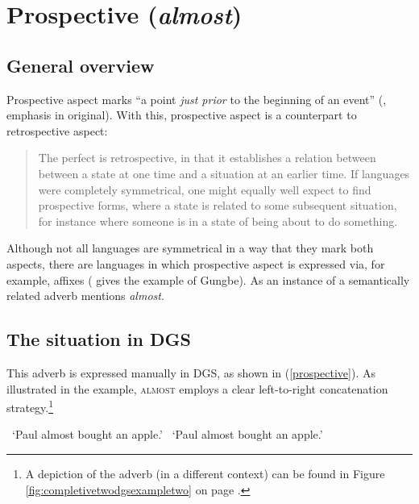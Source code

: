 
\section{Prospective (\textit{almost})}
\subsection{General overview}
Prospective aspect marks ``a point \textit{just prior} to the beginning of an event'' (\citealt[332]{frawley1992linguistic}, emphasis in original). With this, prospective aspect is a counterpart to retrospective aspect:

\begin{quote}
The perfect is retrospective, in that it establishes a relation between between a state at one time and a situation at an earlier time. If languages were completely symmetrical, one might equally well expect to find prospective forms, where a state is related to some subsequent situation, for instance where someone is in a state of being about to do something. \citep[64]{comrie1976aspect}
\end{quote}

\noindent Although not all languages are symmetrical in a way that they mark both aspects, there are languages in which prospective aspect is expressed via, for example, affixes (\citealt[99]{cinque1999adverbs} gives the example of Gungbe). As an instance of a semantically related adverb \citet[99]{cinque1999adverbs} mentions \textit{almost}.

\subsection{The situation in DGS}
This adverb is expressed manually in DGS, as shown in (\ref{prospective}). As illustrated in the example, \textsc{almost} employs a clear left-to-right concatenation strategy.\footnote{ A depiction of the adverb (in a different context) can be found in Figure \ref{fig:completivetwodgsexampletwo} on page \pageref{fig:completivetwodgsexampletwo}.}

\begin{exe}
\ex\label{prospective}\begin{xlist} 
\glt \textcolor{white}{*}`Paul almost bought an apple.' \label{ex:retrospectiveaa}
\glt \textcolor{white}{*}`Paul almost bought an apple.' \label{ex:retrospectiveab}
\end{xlist}
\end{exe} 

